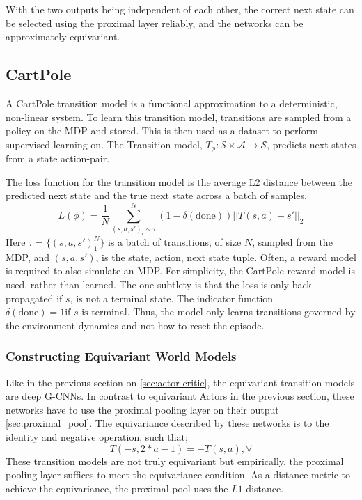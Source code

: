 With the two outputs being independent of each other, the correct next state can be selected using the proximal layer reliably, and the networks can be approximately equivariant.



\subsection{CartPole}
A CartPole transition model is a functional approximation to a deterministic, non-linear system.
To learn this transition model, transitions are sampled from a policy on the MDP and stored. This is then used as a dataset to perform supervised learning on. The Transition model, $T_\phi: \mathcal{S} \times \mathcal{A} \rightarrow \mathcal{S}$, predicts next states from a state action-pair.

The loss function for the transition model is the average L2 distance between the predicted next state and the true next state across a batch of samples.
\begin{equation}
	L(\phi) = \frac{1}{N}\sum^N_{(s, a, s')_i \sim \mathcal \tau} (1-\delta(\text{done}))||T(s, a) - s'||_2
\end{equation}
Here $\tau = \{(s, a , s')_1^N\}$ is a batch of transitions, of size $N$, sampled from the MDP, and $(s, a, s')$, is the state, action, next state tuple. Often, a reward model is required to also simulate an MDP. For simplicity, the CartPole reward model is used, rather than learned. The one subtlety is that the loss is only back-propagated if $s$, is not a terminal state. The indicator function $\delta(\text{done}) = 1 \text{if $s$ is terminal} $. Thus, the model only learns transitions governed by the environment dynamics and not how to reset the episode.


\subsubsection{Constructing Equivariant World Models}
Like in the previous section on \ref{sec:actor-critic}, the equivariant transition models are deep G-CNNs. In contrast to equivariant Actors in the previous section, these networks have to use the proximal pooling layer on their output \ref{sec:proximal_pool}. The equivariance described by these networks is to the identity and negative operation, such that;
\begin{equation}
	T(- s, 2*a - 1) =  -T(s, a), \forall
\end{equation}
These transition models are not truly equivariant but empirically, the proximal pooling layer suffices to meet the equivariance condition. As a distance metric to achieve the equivariance, the proximal pool uses the $L1$ distance.

